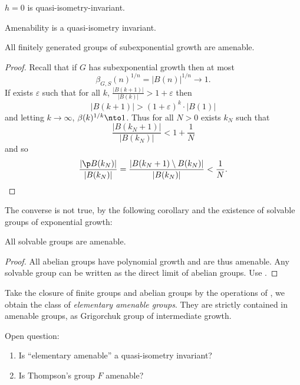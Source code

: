 \documentclass[a4paper]{article}
\begin{document}
\begin{eg}
  \(h = 0\) is quasi-isometry-invariant.
\end{eg}

\begin{corollary}
  Amenability is a quasi-isometry invariant.
\end{corollary}

\begin{corollary}
  All finitely generated groups of subexponential growth are amenable.
\end{corollary}

\begin{proof}
  Recall that if \(G\) has subexponential growth then at most
  \[
    \beta_{G, S}(n)^{1/n} = |B(n)|^{1/n} \to 1.
  \]
  If exists \(\varepsilon\) such that for all \(k\), \(\frac{|B(k + 1)|}{|B(k)|} > 1 + \varepsilon\) then
  \[
    |B(k + 1)| > (1 + \varepsilon)^k \cdot |B(1)|
  \]
  and letting \(k \to \infty\), \(\beta(k)^{1/k} \nto 1\). Thus for all \(N > 0\) exists \(k_N\) such that
  \[
    \frac{|B(k_N + 1)|}{|B(k_N)|} < 1 + \frac{1}{N}
  \]
  and so
  \[
    \frac{|\p B(k_N)|}{|B(k_N)|} = \frac{|B(k_N + 1) \setminus B(k_N)|}{|B(k_N)|} < \frac{1}{N}.
  \]
\end{proof}

The converse is not true, by the following corollary and the existence of solvable groups of exponential growth:

\begin{corollary}
  All solvable groups are amenable.
\end{corollary}

\begin{proof}
  All abelian groups have polynomial growth and are thus amenable. Any solvable group can be written as the direct limit of abelian groups. Use .
\end{proof}

Take the closure of finite groups and abelian groups by the operations of , we obtain the class of \emph{elementary amenable groups}. They are strictly contained in amenable groups, as Grigorchuk group of intermediate growth.

Open question:
\begin{enumerate}
\item Is ``elementary amenable'' a quasi-isometry invariant?
\item Is Thompson's group \(F\) amenable?
\end{enumerate}
\end{document}
